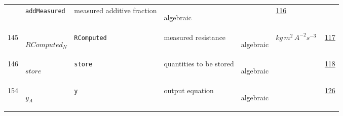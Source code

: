 \begin{longtable}{|p{1cm}|p{2.5cm}|p{4.5cm}|p{8cm}|p{3.0cm}|p{3cm}|p{1cm}|}
             & \verb|addMeasured|
             & measured additive fraction
             & \begin{lay}algebraic \end{lay}
             & $  $
             & \hyperlink{"e:116"}{ 116 }
                 \\
    145
             & \hypertarget{"v:145"}{ $ {RComputed}{_{N}} $}
             & \verb|RComputed|
             & measured resistance 
             & \begin{lay}algebraic \end{lay}
             & $ kg \,m^{2} \,A^{-2} s^{-3} \, $
             & \hyperlink{"e:117"}{ 117 }
                 \\
    146
             & \hypertarget{"v:146"}{ $ {store}{_{}} $}
             & \verb|store|
             & quantities to be stored
             & \begin{lay}algebraic \end{lay}
             & $  $
             & \hyperlink{"e:118"}{ 118 }
                 \\
    154
             & \hypertarget{"v:154"}{ $ {y}{_{A}} $}
             & \verb|y|
             & output equation
             & \begin{lay}algebraic \end{lay}
             & $  $
             & \hyperlink{"e:126"}{ 126 }
                 \\
    \end{longtable}